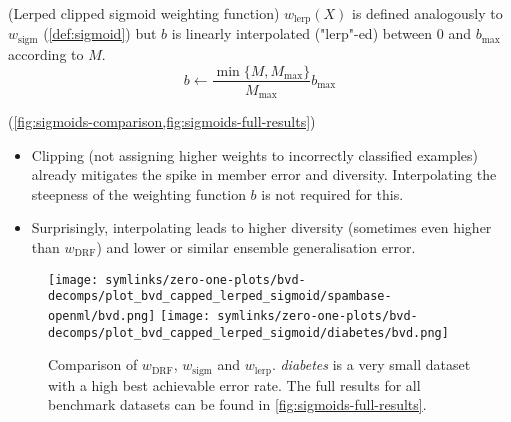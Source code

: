 \documentclass[../main.tex]{subfiles}
\begin{document}
\begin{definition} (Lerped clipped sigmoid weighting function)
$w_{\text{lerp}}(X)$ is defined analogously to $w_\text{sigm}$ (\cf \ref{def:sigmoid}) but $b$ is linearly interpolated ("lerp"-ed) between $0$ and $b_{\text{max}}$ according to $M$.
$$
b \gets \frac{\min \{ M, M_{\text{max}} \}}{M_{\text{max} }} b_{\text{max} }
$$
\end{definition}

\begin{observation} (\cf \cref{fig:sigmoids-comparison,fig:sigmoids-full-results})
    \begin{itemize}
        \item Clipping (not assigning higher weights to incorrectly classified examples) already mitigates the spike in member error and diversity. Interpolating the steepness of the weighting function $b$ is not required for this. 
        \item Surprisingly, interpolating leads to higher diversity (sometimes even higher than $w_\text{DRF}$) and lower or similar ensemble generalisation error.
    \end{itemize}
\end{observation}


\begin{figure*}
    \texttt{[image: symlinks/zero-one-plots/bvd-decomps/plot\_bvd\_capped\_lerped\_sigmoid/spambase-openml/bvd.png]}
    \texttt{[image: symlinks/zero-one-plots/bvd-decomps/plot\_bvd\_capped\_lerped\_sigmoid/diabetes/bvd.png]}
    \caption{
        Comparison of $w_\text{DRF}$, $w_\text{sigm}$ and $w_\text{lerp}$. \textit{diabetes} is a very small dataset with a high best achievable error rate.
        The full results for all benchmark datasets can be found in \cref{fig:sigmoids-full-results}. \bvdlegend
    }
    \label{fig:sigmoids-comparison}
\end{figure*}
\end{document}
